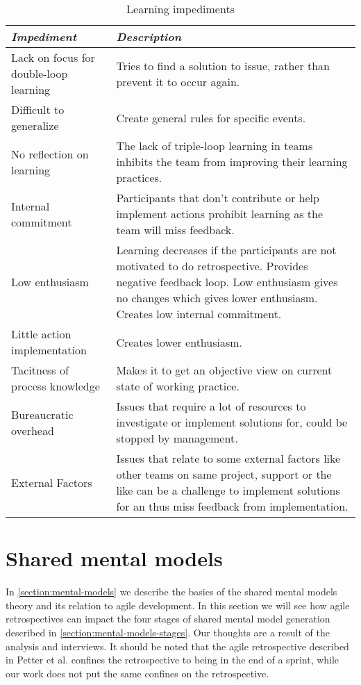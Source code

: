 \begin{table}[h]
	\begin{center}
		\caption{Learning impediments}
		\label{table:learning-impediments}
		\begin{tabular}{p{} p{}}
			\hline
			\textit{Impediment} & \textit{Description} \\
			\hline
			Lack on focus for double-loop learning & Tries to find a solution to issue, rather than prevent it to occur again. \\
			Difficult to generalize & Create general rules for specific events. \\
			No reflection on learning & The lack of triple-loop learning in teams inhibits the team from improving their learning practices. \\
			Internal commitment & Participants that don't contribute or help implement actions prohibit learning as the team will miss feedback. \\ 
			Low enthusiasm & Learning decreases if the participants are not motivated to do retrospective. Provides negative feedback loop. Low enthusiasm gives no changes which gives lower enthusiasm. Creates low internal commitment. \\
			Little action implementation & Creates lower enthusiasm. \\
			Tacitness of process knowledge & Makes it to get an objective view on current state of working practice. \\
			Bureaucratic overhead & Issues that require a lot of resources to investigate or implement solutions for, could be stopped by management. \\
			External Factors & Issues that relate to some external factors like other teams on same project, support or the like can be a challenge to implement solutions for an thus miss feedback from implementation.\\
			\hline
		\end{tabular}
	\end{center}
\end{table}


\clearpage
\section{Shared mental models}
In \autoref{section:mental-models} we describe the basics of the shared mental models theory and its relation to agile development. In this section we will see how agile retrospectives can impact the four stages of shared mental model generation described in \autoref{section:mental-models-stages}. Our thoughts are a result of the analysis and interviews. It should be noted that the agile retrospective described in Petter et al. \cite{Petter2013} confines the retrospective to being in the end of a sprint, while our work does not put the same confines on the retrospective.

